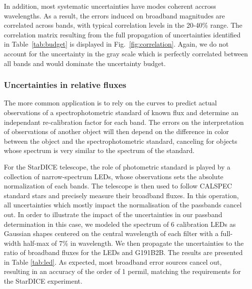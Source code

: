 In addition, most systematic uncertainties have modes coherent accross
wavelengths. As a result, the errors induced on broadband magnitudes
are correlated across bands, with typical correlation levels in the
20-40\% range. The correlation matrix resulting from the full
propagation of uncertainties identified in Table~\ref{tab:budget} is
displayed in Fig.~\ref{fig:correlation}. Again, we do not account for
the uncertainty in the gray scale which is perfectly correlated
between all bands and would dominate the uncertainty budget.

\subsubsection{Uncertainties in relative fluxes}
\label{sec:relative}

The more common application is to rely on the curves to predict actual
observations of a spectrophotometric standard of known flux and
determine an independant re-calibration factor for each band. The
errors on the interpretation of observations of another object will
then depend on the difference in color between the object and the
spectrophotometric standard, canceling for objects whose spectrum is
very similar to the spectrum of the standard.

For the StarDICE telescope, the role of photometric standard is played
by a collection of narrow-spectrum LEDs, whose observations sets the
absolute normalization of each bands. The telescope is then used to
follow CALSPEC standard stars and precisely measure their broadband
fluxes. In this operation, all uncertainties which mostly impact the
normalisation of the passbands cancel out. In order to illustrate the
impact of the uncertainties in our passband determination in this
case, we modeled the spectrum of 6 calibration LEDs as Gaussian shapes
centered on the central wavelength of each filter with a full-width
half-max of 7\% in wavelength. We then propagate the uncertainties to
the ratio of broadband fluxes for the LEDs and G191B2B. The results
are presented in Table \ref{tab:led}. As expected, most broadband
error sources cancel out, resulting in an accuracy of the order of 1
permil, matching the requirements for the StarDICE experiment.

